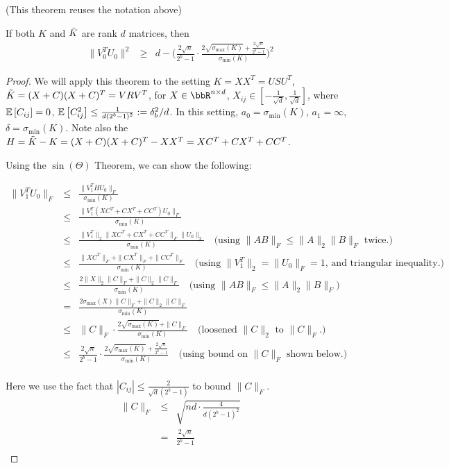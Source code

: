 (This theorem reuses the notation above)
\begin{theorem}
If both $K$ and $\tK$ are rank $d$ matrices, then
\begin{eqnarray*}
\|V_0^T U_0\|^2 &\geq& d - \Bigg(\frac{2\sqrt{n}}{2^b-1} \cdot \frac{2\sqrt{\sigma_{\max}(K)} + \frac{2\sqrt{n}}{2^b-1} }{\sigma_{\min}(K)} \Bigg)^2
\end{eqnarray*}
\end{theorem}
\begin{proof}
We will apply this theorem to the setting $K = XX^T = USU^T$, $\tK = (X+C)(X+C)^T = VRV^T$,
for $X \in \RR^{n \times d}$, $X_{ij}\in [-\frac{1}{\sqrt{d}},\frac{1}{\sqrt{d}}]$,
where $\expect{}{C_{ij}} = 0$, $\expect{}{C_{ij}^2} \leq \frac{1}{d(2^b-1)^2} \defeq \delta_b^2/d$.
In this setting, $a_0 = \sigma_{\min}(K)$, $a_1 = \infty$, $\delta=\sigma_{\min}(K)$.
Note also the $H = \tK-K = (X+C)(X+C)^T - XX^T = XC^T + CX^T + CC^T$.

Using the $\sin(\Theta)$ Theorem, we can show the following:

\begin{eqnarray*}
\|V_1^T U_0\|_F &\leq& \frac{\|V_1^T H U_0\|_F}{\sigma_{\min}(K)}\\
&\leq& \frac{\|V_1^T (XC^T + CX^T + CC^T) U_0\|_F}{\sigma_{\min}(K)}\\
&\leq& \frac{\|V_1^T\|_2 \|XC^T + CX^T + CC^T\|_F \|U_0\|_2}{\sigma_{\min}(K)} \quad \text{(using $\|AB\|_F \leq \|A\|_2 \|B\|_F$ twice.)}\\
&\leq& \frac{\|XC^T\|_F + \|CX^T\|_F + \|CC^T\|_F}{\sigma_{\min}(K)} \quad \text{(using $\|V_1^T\|_2 = \|U_0\|_F = 1$, and triangular inequality.)}\\
&\leq& \frac{2\|X\|_2\|C\|_F + \|C\|_2 \|C\|_F}{\sigma_{\min}(K)} \quad \text{(using $\|AB\|_F \leq \|A\|_2 \|B\|_F$)}\\
&=& \frac{2\sigma_{\max}(X)\|C\|_F + \|C\|_2 \|C\|_F}{\sigma_{\min}(K)} \\
&\leq& \|C\|_F \cdot \frac{2\sqrt{\sigma_{\max}(K)} + \|C\|_F }{\sigma_{\min}(K)}  \quad \text{(loosened $\|C\|_2$ to  $\|C\|_F$.)}\\
&\leq& \frac{2\sqrt{n}}{2^b-1} \cdot \frac{2\sqrt{\sigma_{\max}(K)} + \frac{2\sqrt{n}}{2^b-1} }{\sigma_{\min}(K)} \quad \text{(using bound on $\|C\|_F$ shown below.)} \\
\end{eqnarray*}

Here we use the fact that $|C_{ij}| \leq \frac{2}{\sqrt{d}(2^b-1)}$ to bound $\|C\|_F$.
\begin{eqnarray*}
\|C\|_F &\leq& \sqrt{nd \cdot \frac{4}{d(2^b-1)^2}} \\
&=& \frac{2\sqrt{n}}{2^b-1} \\
\end{eqnarray*}


\end{proof}
